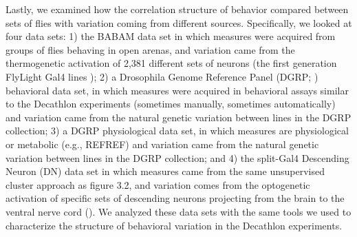 \documentclass[12pt,letterpaper]{article}
\begin{document}
Lastly, we examined how the correlation structure of behavior compared between sets of flies with variation coming from different sources. Specifically, we looked at four data sets: 1) the BABAM data set \cite{Robie_Mapping_2017} in which measures were acquired from groups of flies behaving in open arenas, and variation came from the thermogenetic activation of 2,381 different sets of neurons (the first generation FlyLight Gal4 lines \cite{Jenett_A_2012}); 2) a Drosophila Genome Reference Panel (DGRP; \cite{Mackay_The_2012}) behavioral data set, in which measures were acquired in behavioral assays similar to the Decathlon experiments (sometimes manually, sometimes automatically) and variation came from the natural genetic variation between lines in the DGRP collection; 3) a DGRP physiological data set, in which measures are physiological or metabolic (e.g., REFREF) and variation came from the natural genetic variation between lines in the DGRP collection; and 4) the split-Gal4 Descending Neuron (DN) data set \cite{Cande_Optogenetic_2018} in which measures came from the same unsupervised cluster approach as figure 3.2, and variation comes from the optogenetic activation of specific sets of descending neurons projecting from the brain to the ventral nerve cord (\cite{Namiki_The_2018}). We analyzed these data sets with the same tools we used to characterize the structure of behavioral variation in the Decathlon experiments. 
\end{document}
